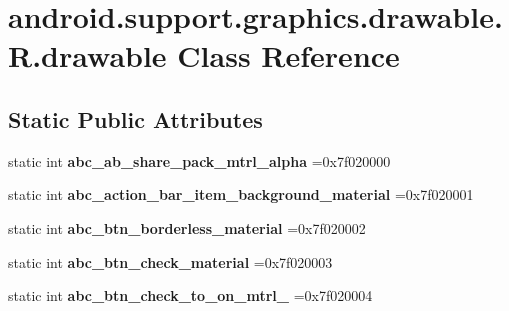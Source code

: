 \hypertarget{classandroid_1_1support_1_1graphics_1_1drawable_1_1R_1_1drawable}{}\section{android.\+support.\+graphics.\+drawable.\+R.\+drawable Class Reference}
\label{classandroid_1_1support_1_1graphics_1_1drawable_1_1R_1_1drawable}
\subsection*{Static Public Attributes}
\begin{DoxyCompactItemize}
\item 
\mbox{\label{classandroid_1_1support_1_1graphics_1_1drawable_1_1R_1_1drawable_a55ef34a48822eceb85a57b5a4cd1c974}} 
static int {\bfseries abc\+\_\+ab\+\_\+share\+\_\+pack\+\_\+mtrl\+\_\+alpha} =0x7f020000
\item 
\mbox{\label{classandroid_1_1support_1_1graphics_1_1drawable_1_1R_1_1drawable_a4eb981ad8106d7f620d6644173a1a9ac}} 
static int {\bfseries abc\+\_\+action\+\_\+bar\+\_\+item\+\_\+background\+\_\+material} =0x7f020001
\item 
\mbox{\label{classandroid_1_1support_1_1graphics_1_1drawable_1_1R_1_1drawable_a6eebd7357338b556fb9b3976ff958a9b}} 
static int {\bfseries abc\+\_\+btn\+\_\+borderless\+\_\+material} =0x7f020002
\item 
\mbox{\label{classandroid_1_1support_1_1graphics_1_1drawable_1_1R_1_1drawable_ae35743502efd498340fd7a9ed60c5525}} 
static int {\bfseries abc\+\_\+btn\+\_\+check\+\_\+material} =0x7f020003
\item 
\mbox{\label{classandroid_1_1support_1_1graphics_1_1drawable_1_1R_1_1drawable_a4d3ebfd60d1c8d6ef90ddb9ba25b2ca9}} 
static int {\bfseries abc\+\_\+btn\+\_\+check\+\_\+to\+\_\+on\+\_\+mtrl\+\_} =0x7f020004
\item 

\end{DoxyCompactItemize}
